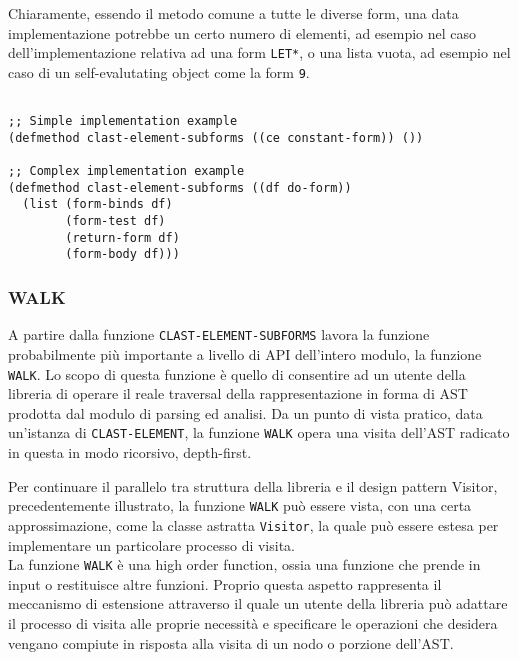 Chiaramente, essendo il metodo comune a tutte le diverse form, una data
implementazione potrebbe un certo numero di elementi, ad esempio nel caso
dell'implementazione relativa ad una form \texttt{LET*}, o una lista vuota, ad
esempio nel caso di un self-evalutating object come la form \texttt{9}.

\begin{lstlisting}[caption=Esempi di implementazione del metodo \texttt
{CLAST-ELEMENT-SUBFORMS}]

;; Simple implementation example
(defmethod clast-element-subforms ((ce constant-form)) ())

;; Complex implementation example
(defmethod clast-element-subforms ((df do-form))
  (list (form-binds df)
        (form-test df)
        (return-form df)
        (form-body df)))

\end{lstlisting}

\subsubsection{WALK}

A partire dalla funzione \texttt{CLAST-ELEMENT-SUBFORMS} lavora la funzione
probabilmente più importante a livello di API dell'intero modulo, la funzione
\texttt{WALK}. Lo scopo di questa funzione è quello di consentire ad un utente
della libreria di operare il reale traversal della rappresentazione in forma di
AST prodotta dal modulo di parsing ed analisi. Da un punto di vista pratico,
data un'istanza di \texttt{CLAST-ELEMENT}, la funzione \texttt{WALK} opera una
visita dell'AST radicato in questa in modo ricorsivo, depth-first.

Per continuare il parallelo tra struttura della libreria e il design pattern
Visitor, precedentemente illustrato, la funzione \texttt{WALK} può essere
vista, con una certa approssimazione, come la classe astratta
\texttt{Visitor}, la quale può essere estesa per implementare un particolare
processo di visita.\\


La funzione \texttt{WALK} è una high order function, ossia una funzione che
prende in input o restituisce altre funzioni. Proprio questa aspetto
rappresenta il meccanismo di estensione attraverso il quale un utente della
libreria può adattare il processo di visita alle proprie necessità e
specificare le operazioni che desidera vengano compiute in risposta alla
visita di un nodo o porzione dell'AST.

